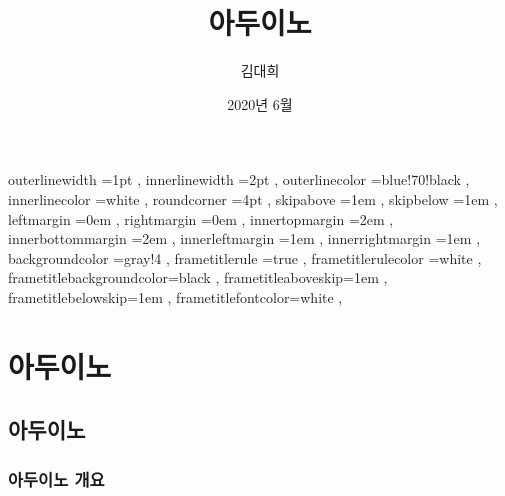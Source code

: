 \documentclass[12pt, a4paper, oneside]{book}
\let\stdsection\section
\renewcommand\section{\newpage\stdsection}
\begin{document}
	
			\dominitoc
			\doparttoc			




			\title{아두이노}
			\author{김대희}
			\date{2020년 6월}
			\maketitle


			\tableofcontents 		%
			\cleardoublepage
			\listoftables 			%





		 {
						outerlinewidth		=1pt			,%
						innerlinewidth		=2pt			,%
						outerlinecolor		=blue!70!black	,%
						innerlinecolor		=white 			,%
						roundcorner			=4pt			,%
						skipabove			=1em 			,%
						skipbelow			=1em 			,%
						leftmargin			=0em			,%
						rightmargin			=0em			,%
						innertopmargin		=2em 			,%
						innerbottommargin 	=2em 			,%
						innerleftmargin		=1em 			,%
						innerrightmargin		=1em 			,%
						backgroundcolor		=gray!4			,%
						frametitlerule		=true 			,%
						frametitlerulecolor	=white			,%
						frametitlebackgroundcolor=black		,%
						frametitleaboveskip=1em 			,%
						frametitlebelowskip=1em 			,%
						frametitlefontcolor=white 			,%
						}



	\part{ 아두이노 }
	\noptcrule
	\parttoc				



	\chapter{아두이노 }
	\noptcrule

	\newpage	
	\minitoc





%
	\section{아두이노 개요}
\end{document}
